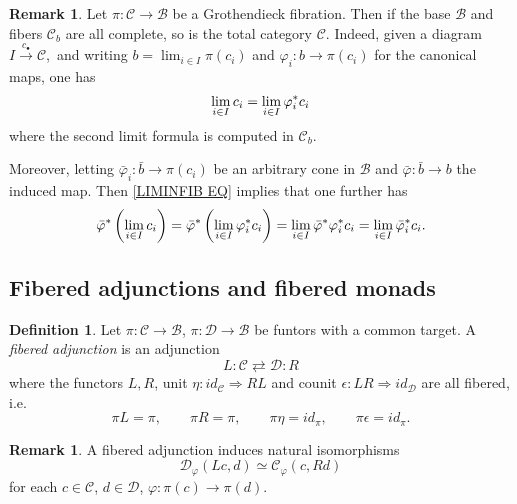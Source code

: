 \documentclass[a4paper,10pt
,draft
]{article}%
\numberwithin{equation}{section}
\numberwithin{figure}{section}
\theoremstyle{definition} %
\newtheorem{definition}[equation]{Definition}%
\newtheorem{remark}[equation]{Remark}%
\newcommand{\1}{\ensuremath{\mathbbm 1}}%
\begin{document}
\begin{remark}
Let $\pi \colon \mathcal{C} \to \mathcal{B}$ be a Grothendieck fibration.
Then if the base $\mathcal{B}$ and fibers 
$\mathcal{C}_b$
are all complete, so is the total category $\mathcal{C}$.
%
Indeed, given a diagram $I \xrightarrow{c_{\bullet}} \mathcal{C}$,\
and writing
$b = \lim_{i \in I} \pi(c_i)$
and 
$\varphi_i \colon b \to \pi(c_i)$
for the canonical maps,
one has
\begin{equation}\label{LIMINFIB EQ}
\lim_{i \in I} c_i = 
\lim_{i \in I} \varphi_{i}^{\**}c_i
\end{equation}
where the second limit formula is computed in $\mathcal{C}_b$.

Moreover, letting $\bar{\varphi}_i \colon \bar{b} \to \pi(c_i)$
be an arbitrary cone in $\mathcal{B}$
and $\bar{\varphi} \colon \bar{b} \to b$
the induced map.
Then \eqref{LIMINFIB EQ} implies that one further has
\begin{equation}\label{LIMINFIBSUP EQ}
\bar{\varphi}^{\**}\left(\lim_{i \in I} c_i\right) 
	= 
\bar{\varphi}^{\**}\left(\lim_{i \in I} \varphi_{i}^{\**}c_i\right)
	=
\lim_{i \in I} \bar{\varphi}^{\**} \varphi_{i}^{\**}c_i
	=
\lim_{i \in I} \bar{\varphi}_{i}^{\**}c_i.
\end{equation}
\end{remark}





\subsection{Fibered adjunctions and fibered monads}
\label{FIBCAT_SEC}



\begin{definition}
Let 
$\pi \colon \mathcal{C} \to \mathcal{B}$,
$\pi \colon \mathcal{D} \to \mathcal{B}$
be funtors with a common target.
A \emph{fibered adjunction} is an adjunction
\[
L \colon \mathcal{C} \rightleftarrows \mathcal{D} \colon R
\]
where the functors $L,R$, 
unit $\eta \colon id_{\mathcal{C}} \Rightarrow RL$ and 
counit $\epsilon \colon LR \Rightarrow id_{\mathcal{D}}$
are all fibered, i.e.
\[
\pi L=\pi, \qquad
\pi R = \pi, \qquad
\pi \eta = id_{\pi}, \qquad 
\pi\epsilon = id_{\pi}.
\]
\end{definition}



\begin{remark}
A fibered adjunction induces natural isomorphisms
\[
\mathcal{D}_{\varphi}\left(Lc,d\right)
\simeq
\mathcal{C}_{\varphi}\left(c,Rd\right)
\]
for each $c\in \mathcal{C}$, $d \in \mathcal{D}$, 
$\varphi \colon \pi(c)\to \pi(d)$. 
\end{remark}
\end{document}
